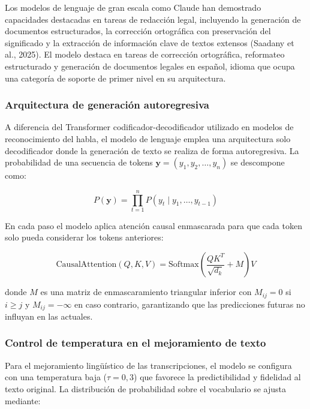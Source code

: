 \documentclass[12pt,a4paper,oneside]{article}
\begin{document}
Los modelos de lenguaje de gran escala como Claude han demostrado capacidades destacadas en tareas de redacci\'on legal, incluyendo la generaci\'on de documentos estructurados, la correcci\'on ortogr\'afica con preservaci\'on del significado y la extracci\'on de informaci\'on clave de textos extensos (Saadany et al., 2025). El modelo destaca en tareas de correcci\'on ortogr\'afica, reformateo estructurado y generaci\'on de documentos legales en espa\~nol, idioma que ocupa una categor\'ia de soporte de primer nivel en su arquitectura.

\subsubsection{Arquitectura de generaci\'on autoregresiva}

A diferencia del Transformer codificador-decodificador utilizado en modelos de reconocimiento del habla, el modelo de lenguaje emplea una arquitectura solo decodificador donde la generaci\'on de texto se realiza de forma autoregresiva. La probabilidad de una secuencia de tokens $\mathbf{y} = (y_1, y_2, \ldots, y_n)$ se descompone como:

\begin{equation}
P(\mathbf{y}) = \prod_{t=1}^{n} P(y_t \mid y_1, \ldots, y_{t-1})
\end{equation}

En cada paso el modelo aplica atenci\'on causal enmascarada para que cada token solo pueda considerar los tokens anteriores:

\begin{equation}
\text{CausalAttention}(Q, K, V) = \text{Softmax}\!\left(\frac{QK^T}{\sqrt{d_k}} + M\right) V
\end{equation}

donde $M$ es una matriz de enmascaramiento triangular inferior con $M_{ij} = 0$ si $i \geq j$ y $M_{ij} = -\infty$ en caso contrario, garantizando que las predicciones futuras no influyan en las actuales.

\subsubsection{Control de temperatura en el mejoramiento de texto}

Para el mejoramiento ling\"u\'istico de las transcripciones, el modelo se configura con una temperatura baja ($\tau = 0{,}3$) que favorece la predictibilidad y fidelidad al texto original. La distribuci\'on de probabilidad sobre el vocabulario se ajusta mediante:
\end{document}
